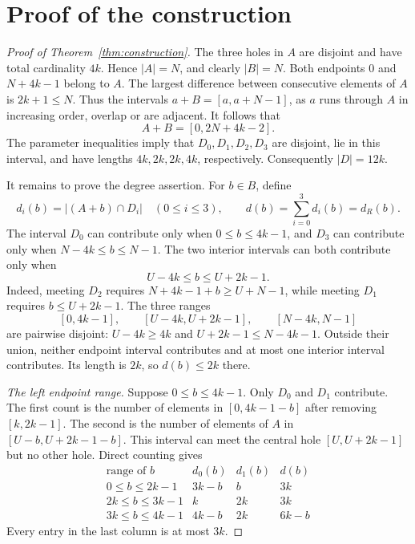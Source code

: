 \documentclass[11pt]{article}
\begin{document}
\section{Proof of the construction}
\begin{proof}[Proof of Theorem~\ref{thm:construction}]
The three holes in $A$ are disjoint and have total cardinality $4k$. Hence $|A|=N$, and clearly $|B|=N$. Both endpoints $0$ and $N+4k-1$ belong to $A$. The largest difference between consecutive elements of $A$ is $2k+1\leq N$. Thus the intervals $a+B=[a,a+N-1]$, as $a$ runs through $A$ in increasing order, overlap or are adjacent. It follows that
\begin{equation}\label{eq:full}
 A+B=[0,2N+4k-2].
\end{equation}
The parameter inequalities imply that $D_0,D_1,D_2,D_3$ are disjoint, lie in this interval, and have lengths $4k,2k,2k,4k$, respectively. Consequently $|D|=12k$.

It remains to prove the degree assertion. For $b\in B$, define
\[
 d_i(b)=|(A+b)\cap D_i|\quad(0\leq i\leq3),\qquad
 d(b)=\sum_{i=0}^3d_i(b)=d_R(b).
\]
The interval $D_0$ can contribute only when $0\leq b\leq4k-1$, and $D_3$ can contribute only when $N-4k\leq b\leq N-1$. The two interior intervals can both contribute only when
\[
 U-4k\leq b\leq U+2k-1.
\]
Indeed, meeting $D_2$ requires $N+4k-1+b\geq U+N-1$, while meeting $D_1$ requires $b\leq U+2k-1$. The three ranges
\begin{equation}\label{eq:ranges}
 [0,4k-1],\qquad [U-4k,U+2k-1],\qquad [N-4k,N-1]
\end{equation}
are pairwise disjoint: $U-4k\geq4k$ and $U+2k-1\leq N-4k-1$. Outside their union, neither endpoint interval contributes and at most one interior interval contributes. Its length is $2k$, so $d(b)\leq2k$ there.

\medskip\noindent\textit{The left endpoint range.}
Suppose $0\leq b\leq4k-1$. Only $D_0$ and $D_1$ contribute. The first count is the number of elements in $[0,4k-1-b]$ after removing $[k,2k-1]$. The second is the number of elements of $A$ in $[U-b,U+2k-1-b]$. This interval can meet the central hole $[U,U+2k-1]$ but no other hole. Direct counting gives
\begin{equation}\label{eq:lefttable}
\begin{array}{c|c|c|c}
 \text{range of }b&d_0(b)&d_1(b)&d(b)\\\hline
 0\leq b\leq2k-1&3k-b&b&3k\\
 2k\leq b\leq3k-1&k&2k&3k\\
 3k\leq b\leq4k-1&4k-b&2k&6k-b
\end{array}
\end{equation}
Every entry in the last column is at most $3k$.


\end{proof}
\end{document}
